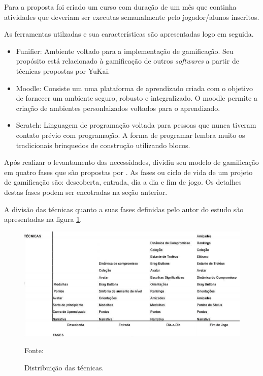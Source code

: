 Para a proposta foi criado um curso com duração de um mês que continha atividades que deveriam ser executas semanalmente pelo
jogador/alunos inscritos.

As ferramentas utilzadas e sua características são apresentadas logo em seguida.

\begin{itemize}
	\item Funifier: Ambiente voltado para a implementação de gamificação. Seu propósito está relacionado à gamificação de outros \textit{softwares}
		a partir de técnicas propostas por YuKai.
	\item Moodle: Consiste um uma plataforma de aprendizado criada com o objetivo de fornecer um ambiente seguro, robusto e integralizado.
		O moodle permite a criação de ambientes personlaizados voltados para o aprendizado.
	\item Scratch: Linguagem de programação voltada para pessoas que nunca tiveram contato prévio com programação. A forma de programar lembra
		muito os tradicionais brinquedos de construção utilizando blocos.
\end{itemize}

Após realizar o levantamento das necessidades,  dividiu seu modelo de gamificação em quatro fases que são propostas por .
As fases ou ciclo de vida de um projeto de gamificação são: descoberta, entrada, dia a dia e fim de jogo. Os detalhes destas fases podem ser encotradas na seção anterior.

A divisão das técnicas quanto a suas fases definidas pelo autor do estudo são apresentadas na figura \ref{fases}. 

\begin{figure}[h]
	\centering
	\includegraphics[keepaspectratio=true,scale=0.65]{figuras/fases.png}
	\caption{Distribuição das técnicas.}
	Fonte: \cite{wilker}
	\label{fases}
\end{figure}


